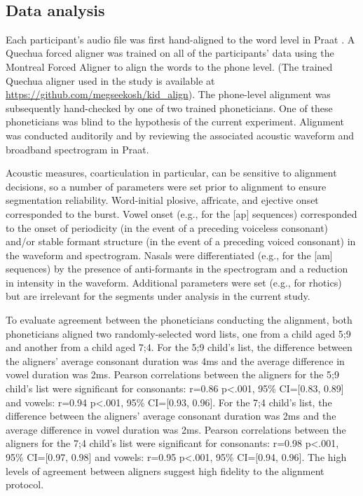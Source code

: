 \documentclass[a4paper,man,floatsintext,natbib,donotrepeattitle, apacite]{apa6}
\begin{document}
~
~

\subsection{Data analysis}

Each participant's audio file was first hand-aligned to the word level in Praat \citep{boersmaPraatDoingPhonetics2018}. A Quechua forced aligner was trained on all of the participants' data using the Montreal Forced Aligner \citep{mcauliffeMontrealForcedAligner2017} to align the words to the phone level. (The trained Quechua aligner used in the study is available at \url{https://github.com/megseekosh/kid_align}). The phone-level alignment was subsequently hand-checked by one of two trained phoneticians. One of these phoneticians was blind to the hypothesis of the current experiment. Alignment was conducted auditorily and by reviewing the associated acoustic waveform and broadband spectrogram in Praat.

Acoustic measures, coarticulation in particular, can be sensitive to alignment decisions, so a number of parameters were set prior to alignment to ensure segmentation reliability. Word-initial plosive, affricate, and ejective onset corresponded to the burst. Vowel onset (e.g., for the [ap] sequences) corresponded to the onset of periodicity (in the event of a preceding voiceless consonant) and/or stable formant structure (in the event of a preceding voiced consonant) in the waveform and spectrogram. Nasals were differentiated (e.g., for the [am] sequences) by the presence of anti-formants in the spectrogram and a reduction in intensity in the waveform. Additional parameters were set (e.g., for rhotics) but are irrelevant for the segments under analysis in the current study. 

To evaluate agreement between the phoneticians conducting the alignment, both phoneticians aligned two randomly-selected word lists, one from a child aged 5;9 and another from a child aged 7;4. For the 5;9 child's list, the difference between the aligners’ average consonant duration was 4ms and the average difference in vowel duration was 2ms. Pearson correlations between the aligners for the 5;9 child's list were significant for consonants: r=0.86 p<.001, 95\% CI=[0.83, 0.89] and vowels: r=0.94 p<.001, 95\% CI=[0.93, 0.96]. For the 7;4 child's list, the difference between the aligners’ average consonant duration was 2ms and the average difference in vowel duration was 2ms. Pearson correlations between the aligners for the 7;4 child's list were significant for consonants: r=0.98 p<.001, 95\% CI=[0.97, 0.98] and vowels: r=0.95 p<.001, 95\% CI=[0.94, 0.96]. The high levels of agreement between aligners suggest high fidelity to the alignment protocol.
\end{document}
